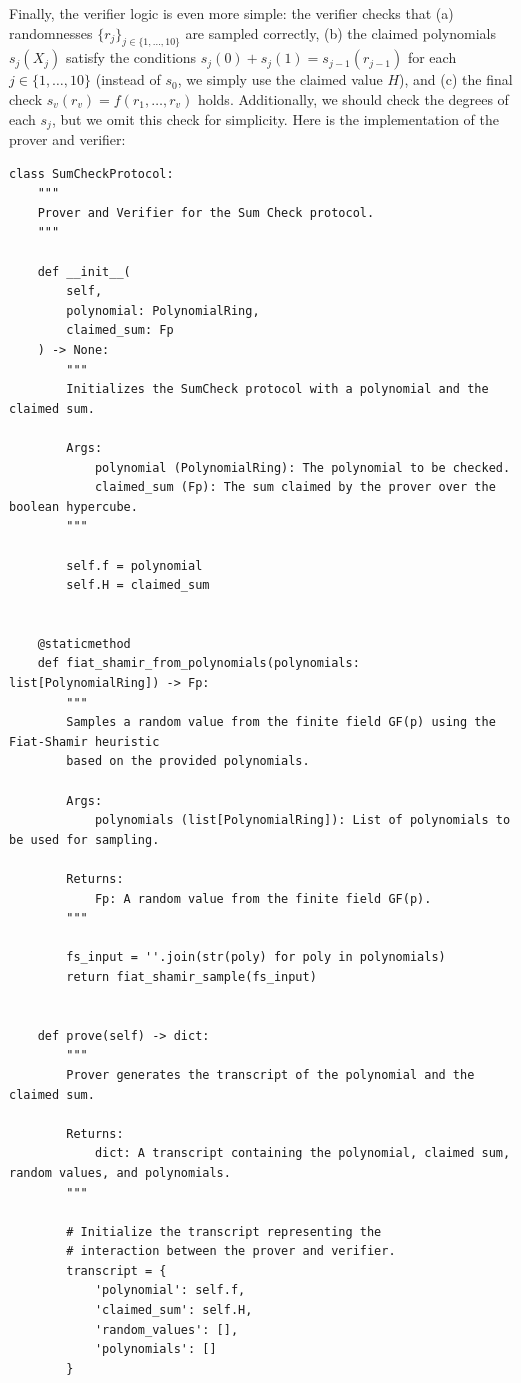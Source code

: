 Finally, the verifier logic is even more simple: the verifier checks that (a)
randomnesses $\{r_j\}_{j \in \{1,\dots,10\}}$ are sampled correctly, (b) the
claimed polynomials $s_j(X_j)$ satisfy the conditions $s_j(0) + s_j(1) =
s_{j-1}(r_{j-1})$ for each $j \in \{1,\dots,10\}$ (instead of $s_0$, we simply
use the claimed value $H$), and (c) the final check $s_v(r_v) =
f(r_1,\dots,r_v)$ holds. Additionally, we should check the degrees of each
$s_j$, but we omit this check for simplicity. Here is the implementation of the
prover and verifier:
\begin{verbatim}
class SumCheckProtocol:
    """
    Prover and Verifier for the Sum Check protocol.
    """

    def __init__(
        self, 
        polynomial: PolynomialRing, 
        claimed_sum: Fp
    ) -> None:
        """
        Initializes the SumCheck protocol with a polynomial and the claimed sum.

        Args:
            polynomial (PolynomialRing): The polynomial to be checked.
            claimed_sum (Fp): The sum claimed by the prover over the boolean hypercube.
        """

        self.f = polynomial
        self.H = claimed_sum


    @staticmethod
    def fiat_shamir_from_polynomials(polynomials: list[PolynomialRing]) -> Fp:
        """
        Samples a random value from the finite field GF(p) using the Fiat-Shamir heuristic
        based on the provided polynomials.

        Args:
            polynomials (list[PolynomialRing]): List of polynomials to be used for sampling.

        Returns:
            Fp: A random value from the finite field GF(p).
        """
        
        fs_input = ''.join(str(poly) for poly in polynomials)
        return fiat_shamir_sample(fs_input)


    def prove(self) -> dict:
        """
        Prover generates the transcript of the polynomial and the claimed sum.

        Returns:
            dict: A transcript containing the polynomial, claimed sum, random values, and polynomials.
        """

        # Initialize the transcript representing the 
        # interaction between the prover and verifier.
        transcript = {
            'polynomial': self.f,
            'claimed_sum': self.H,
            'random_values': [],
            'polynomials': []
        }


\end{verbatim}
